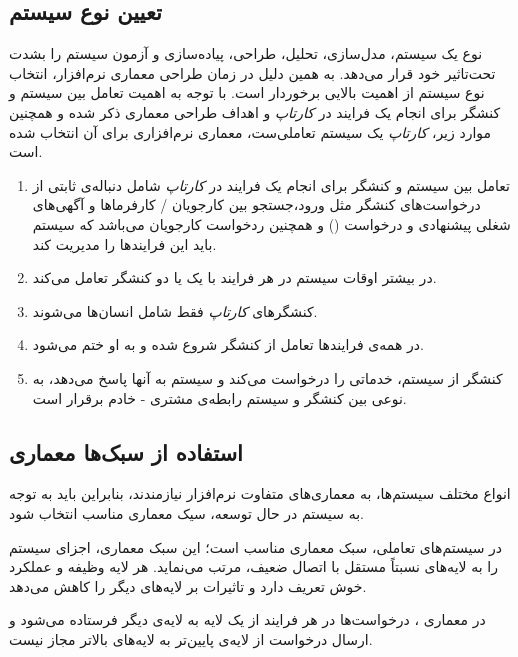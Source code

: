 \subsection{تعیین نوع سیستم}
نوع یک سیستم، مدل‌سازی، تحلیل، طراحی، پیاده‌سازی و آزمون سیستم را بشدت تحت‌تاثیر خود قرار می‌دهد. به همین دلیل در زمان طراحی معماری نرم‌افزار، انتخاب نوع سیستم از اهمیت بالایی برخوردار است. با توجه به اهمیت تعامل بین سیستم و کنشگر برای انجام یک فرایند در \textit{کارتاپ} و اهداف طراحی معماری ذکر شده و همچنین موارد زیر، \textit{کارتاپ} یک سیستم تعاملی‌ست، معماری نرم‌افزاری  برای آن انتخاب شده است.


\begin{enumerate}
	\item		
	تعامل بین سیستم و کنشگر برای انجام یک فرایند در \textit{کارتاپ} شامل دنباله‌ی ثابتی از درخواست‌های کنشگر مثل ورود،‌جستجو بین کارجویان / کارفرما‌ها و آگهی‌های شغلی پیشنهادی و درخواست () و همچنین ردخواست کارجویان می‌باشد که سیستم باید این فرایند‌ها را مدیریت کند.
	
	\item 					
	در بیشتر اوقات سیستم در هر فرایند با یک یا دو کنشگر تعامل می‌کند.
	
	\item 					
	کنشگر‌های \textit{کارتاپ} فقط شامل انسان‌ها می‌شوند.
	
	\item 				
	در همه‌ی فرایند‌ها تعامل از کنشگر شروع شده و به او ختم می‌شود.
	
	\item 
	کنشگر از سیستم،‌ خدماتی را درخواست می‌کند و سیستم به آنها پاسخ می‌دهد، به نوعی بین کنشگر و سیستم رابطه‌ی مشتری - خادم برقرار است.
	
\end{enumerate}

\subsection{استفاده از سبک‌ها معماری}
انواع مختلف سیستم‌‌ها، به معماری‌های متفاوت نرم‌افزار نیازمندند، بنابراین باید به توجه به سیستم در حال توسعه، سیک معماری مناسب انتخاب شود.

در سیستم‌های تعاملی، سبک معماری  مناسب است؛ این سبک معماری، اجزای سیستم را به لایه‌های  نسبتاً مستقل با اتصال ضعیف، مرتب می‌نماید. هر لایه وظیفه و عملکرد خوش تعریف دارد و تاثیرات بر لایه‌های دیگر را کاهش می‌دهد.

در معماری ،‌ درخواست‌ها در هر فرایند از یک لایه به لایه‌ی دیگر فرستاده می‌شود و ارسال درخواست از لایه‌ی پایین‌تر به لایه‌های بالاتر مجاز نیست.

